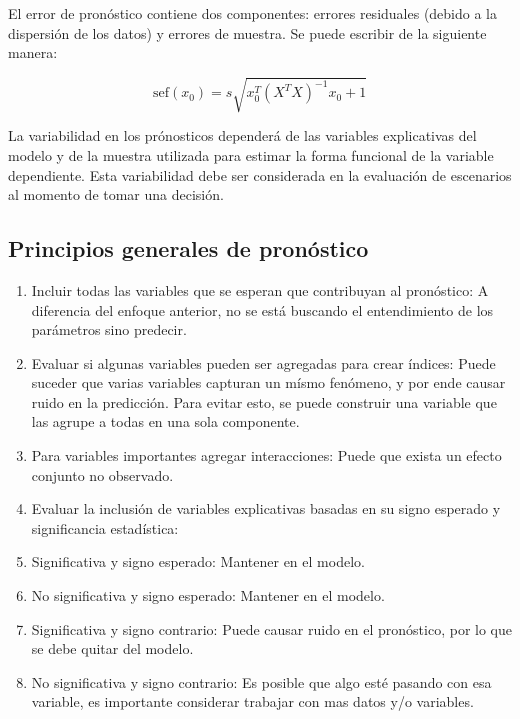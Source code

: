 \documentclass[
]{book}
\providecommand{\tightlist}{%
  \setlength{\itemsep}{0pt}\setlength{\parskip}{0pt}}
\begin{document}
El error de pronóstico contiene dos componentes: errores residuales
(debido a la dispersión de los datos) y errores de muestra. Se puede
escribir de la siguiente manera:

\[\text{sef}(x_0) = s\sqrt{x_0^T(X^TX)^{-1}x_0 + 1}\]

La variabilidad en los prónosticos dependerá de las variables
explicativas del modelo y de la muestra utilizada para estimar la forma
funcional de la variable dependiente. Esta variabilidad debe ser
considerada en la evaluación de escenarios al momento de tomar una
decisión.

\hypertarget{principios-generales-de-pronuxf3stico-1}{%
\subsection{Principios generales de pronóstico}\label{principios-generales-de-pronuxf3stico-1}}

\begin{enumerate}
\def\labelenumi{\arabic{enumi}.}
\tightlist
\item
  Incluir todas las variables que se esperan que contribuyan al
  pronóstico: A diferencia del enfoque anterior, no se está buscando
  el entendimiento de los parámetros sino predecir.
\item
  Evaluar si algunas variables pueden ser agregadas para crear
  índices: Puede suceder que varias variables capturan un mísmo
  fenómeno, y por ende causar ruido en la predicción. Para evitar
  esto, se puede construir una variable que las agrupe a todas en una
  sola componente.
\item
  Para variables importantes agregar interacciones: Puede que exista
  un efecto conjunto no observado.
\item
  Evaluar la inclusión de variables explicativas basadas en su signo
  esperado y significancia estadística:
\item
  Significativa y signo esperado: Mantener en el modelo.
\item
  No significativa y signo esperado: Mantener en el modelo.
\item
  Significativa y signo contrario: Puede causar ruido en el
  pronóstico, por lo que se debe quitar del modelo.
\item
  No significativa y signo contrario: Es posible que algo esté pasando
  con esa variable, es importante considerar trabajar con mas datos
  y/o variables.
\end{enumerate}
\end{document}
